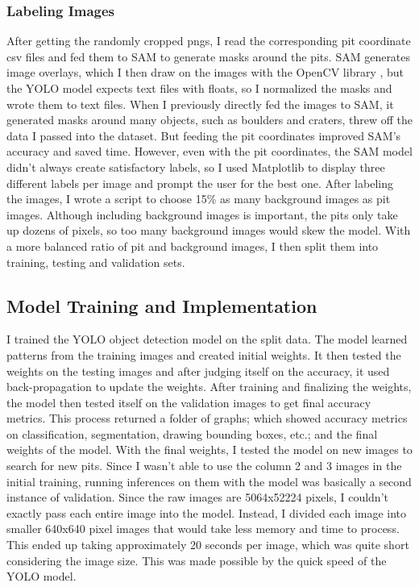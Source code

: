 \documentclass[twoside,10pt]{article}
\begin{document}
\subsubsection{Labeling Images}
After getting the randomly cropped pngs, I read the corresponding pit coordinate csv files and fed them to SAM to generate masks around the pits. SAM generates image overlays, which I then draw on the images with the OpenCV library \cite{opencv_library}, but the YOLO model expects text files with floats, so I normalized the masks and wrote them to text files. When I previously directly fed the images to SAM, it generated masks around many objects, such as boulders and craters, threw off the data I passed into the dataset. But feeding the pit coordinates improved SAM's accuracy and saved time. However, even with the pit coordinates, the SAM model didn't always create satisfactory labels, so I used Matplotlib \cite{Hunter_Matplotlib_A_2D_2007} to display three different labels per image and prompt the user for the best one. After labeling the images, I wrote a script to choose 15\% as many background images as pit images. Although including background images is important, the pits only take up dozens of pixels, so too many background images would skew the model. With a more balanced ratio of pit and background images, I then split them into training, testing and validation sets.

\subsection{Model Training and Implementation}
\fontsize{13}{15}\selectfont
I trained the YOLO object detection model on the split data. The model learned patterns from the training images and created initial weights. It then tested the weights on the testing images and after judging itself on the accuracy, it used back-propagation to update the weights. After training and finalizing the weights, the model then tested itself on the validation images to get final accuracy metrics. This process returned a folder of graphs; which showed accuracy metrics on classification, segmentation, drawing bounding boxes, etc.; and the final weights of the model. With the final weights, I tested the model on new images to search for new pits. Since I wasn't able to use the column 2 and 3 images in the initial training, running inferences on them with the model was basically a second instance of validation. Since the raw images are 5064x52224 pixels, I couldn't exactly pass each entire image into the model. Instead, I divided each image into smaller 640x640 pixel images that would take less memory and time to process. This ended up taking approximately 20 seconds per image, which was quite short considering the image size. This was made possible by the quick speed of the YOLO model.
\end{document}
